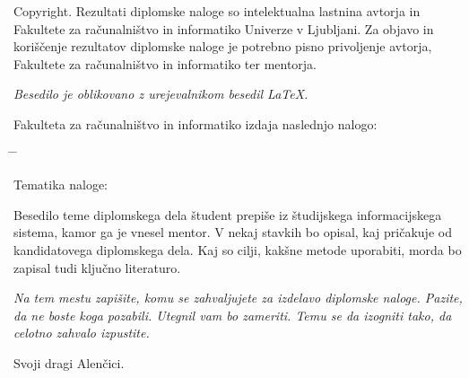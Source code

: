\documentclass[a4paper, 12pt]{book}
\newcommand{\clearemptydoublepage}{\newpage{\pagestyle{empty}\cleardoublepage}}
\begin{document}
\noindent
{\sc Copyright}. 
Rezultati diplomske naloge so intelektualna lastnina avtorja in Fakultete za računalništvo in informatiko Univerze v Ljubljani.
Za objavo in koriščenje rezultatov diplomske naloge je potrebno pisno privoljenje avtorja, Fakultete za računalništvo in informatiko ter mentorja.

\begin{center}
\mbox{}\vfill
\emph{Besedilo je oblikovano z urejevalnikom besedil \LaTeX.}
\end{center}
\clearemptydoublepage

\thispagestyle{empty}
\vspace*{4cm}

\noindent
Fakulteta za računalništvo in informatiko izdaja naslednjo nalogo:
\medskip
\begin{tabbing}
\hspace{32mm}\= \hspace{6cm} \= \kill




Tematika naloge:
\end{tabbing}
Besedilo teme diplomskega dela študent prepiše iz študijskega informacijskega sistema, kamor ga je vnesel mentor. V nekaj stavkih bo opisal, kaj pričakuje od kandidatovega diplomskega dela. Kaj so cilji, kakšne metode uporabiti, morda bo zapisal tudi ključno literaturo.
\vspace{15mm}






\vspace{2cm}

\clearemptydoublepage

\thispagestyle{empty}\mbox{}\vfill\null\it%
\noindent
Na tem mestu zapišite, komu se zahvaljujete za izdelavo diplomske naloge. Pazite, da ne boste koga pozabili. Utegnil vam bo zameriti. Temu se da izogniti tako, da celotno zahvalo izpustite.
\rm\normalfont

\clearemptydoublepage

\thispagestyle{empty}\mbox{}{\textheight}\mbox{}\hfill\begin{minipage}{0.55\textwidth}%
Svoji dragi Alenčici.
\normalfont\end{minipage}

\clearemptydoublepage
\end{document}
